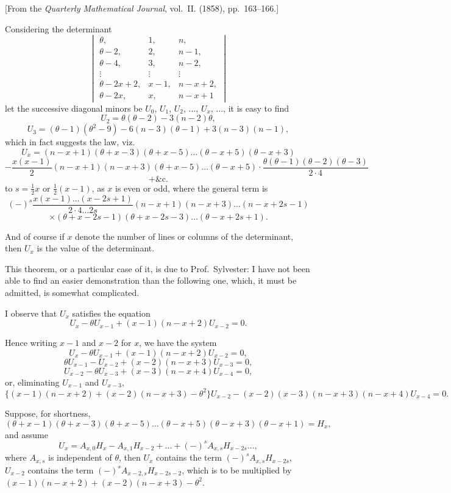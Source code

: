 \documentclass[11pt,a4paper]{book}
\begin{document}
[From the \textit{Quarterly Mathematical Journal}, vol.~II. (1858), pp.~163--166.]

Considering the determinant
\[
\begin{vmatrix}
\theta, & 1, & n, \\
\theta - 2, & 2, & n - 1, \\
\theta - 4, & 3, & n - 2, \\
\vdots & \vdots & \vdots \\
\theta - 2x + 2, & x - 1, & n - x + 2, \\
\theta - 2x, & x, & n - x + 1
\end{vmatrix}
\]
let the successive diagonal minors be $U_0$, $U_1$, $U_2$, $\ldots$, $U_x$, $\ldots$, it is easy to find
\[
U_2 = \theta(\theta - 2) - 3(n - 2)\theta,
\]
\[
U_3 = (\theta - 1)(\theta^2 - 9) - 6(n - 3)(\theta - 1) + 3(n - 3)(n - 1),
\]
which in fact suggests the law, viz.
\[
U_x = (n - x + 1)(\theta + x - 3)(\theta + x - 5)\ldots(\theta - x + 5)(\theta - x + 3)
\]
\[
- \frac{x(x - 1)}{2}(n - x + 1)(n - x + 3)(\theta + x - 5)\ldots(\theta - x + 5) \cdot \frac{\theta(\theta - 1)(\theta - 2)(\theta - 3)}{2 \cdot 4}
\]
\[
+ \&\text{c.}
\]
to $s = \frac{1}{2}x$ or $\frac{1}{2}(x - 1)$, as $x$ is even or odd, where the general term is
\[
(-)^s \frac{x(x - 1)\ldots(x - 2s + 1)}{2 \cdot 4 \ldots 2s} (n - x + 1)(n - x + 3)\ldots(n - x + 2s - 1)
\]
\[
\times (\theta + x - 2s - 1)(\theta + x - 2s - 3)\ldots(\theta - x + 2s + 1).
\]

\newpage
[186]

And of course if $x$ denote the number of lines or columns of the determinant, then $U_x$ is the value of the determinant.

This theorem, or a particular case of it, is due to Prof.\ Sylvester: I have not been able to find an easier demonstration than the following one, which, it must be admitted, is somewhat complicated.

I observe that $U_x$ satisfies the equation
\[
U_x - \theta U_{x-1} + (x - 1)(n - x + 2)U_{x-2} = 0.
\]

Hence writing $x - 1$ and $x - 2$ for $x$, we have the system
\[
U_x - \theta U_{x-1} + (x - 1)(n - x + 2)U_{x-2} = 0,
\]
\[
\theta U_{x-1} - U_{x-2} + (x - 2)(n - x + 3)U_{x-3} = 0,
\]
\[
U_{x-2} - \theta U_{x-3} + (x - 3)(n - x + 4)U_{x-4} = 0,
\]
or, eliminating $U_{x-1}$ and $U_{x-3}$,
\[
\{(x - 1)(n - x + 2) + (x - 2)(n - x + 3) - \theta^2\}U_{x-2} - (x - 2)(x - 3)(n - x + 3)(n - x + 4)U_{x-4} = 0.
\]

Suppose, for shortness,
\[
(\theta + x - 1)(\theta + x - 3)(\theta + x - 5)\ldots(\theta - x + 5)(\theta - x + 3)(\theta - x + 1) = H_x,
\]
and assume
\[
U_x = A_{x,0}H_x - A_{x,1}H_{x-2} + \ldots + (-)^s A_{x,s}H_{x-2s} \ldots,
\]
where $A_{x,s}$ is independent of $\theta$, then $U_x$ contains the term $(-)^s A_{x,s}H_{x-2s}$, $U_{x-2}$ contains the term $(-)^s A_{x-2,s}H_{x-2s-2}$, which is to be multiplied by $(x - 1)(n - x + 2) + (x - 2)(n - x + 3) - \theta^2$.
\end{document}
